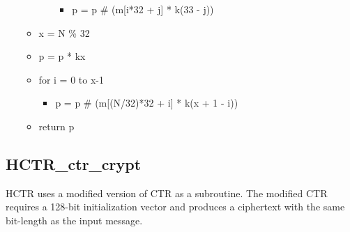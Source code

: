 \documentclass[i-d]{rfc}
\begin{document}
\begin{itemize}
\begin{itemize}
\begin{itemize}
\begin{itemize}
                \item p = p \# (m[i*32 + j] * k\pow(33 - j))
            \end{itemize}
        \end{itemize}
        \item x = N \% 32
        \item p = p * k\pow x
        \item for i = 0 to x-1
        \begin{itemize}
            \item p = p \# (m[(N/32)*32 + i] * k\pow(x + 1 - i))
        \end{itemize}
        \item return p
    \end{itemize}
\end{itemize}

\subsection{HCTR\_ctr\_crypt}
HCTR uses a modified version of CTR as a subroutine. The modified CTR requires a 128-bit initialization vector and produces a ciphertext with the same bit-length as the input message. 
\end{document}
